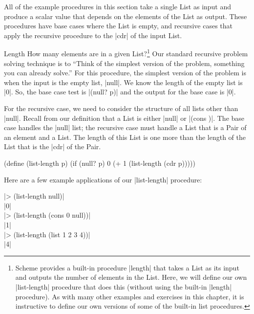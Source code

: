 \begin{schemeregion}
All of the example procedures in this section take a single List as input and produce a scalar value that depends on the elements of the List as output.  These procedures have base cases where the List is empty, and recursive cases that apply the recursive procedure to the \scheme|cdr| of the input List.

\begin{examplenobar}{Length}\label{example:length}  How many elements are in a given List?\footnote{Scheme provides a built-in procedure \scheme|length| that takes a List as its input and outputs the number of elements in the List.  Here, we will define our own \scheme|list-length| procedure that does this (without using the built-in \scheme|length| procedure).  As with many other examples and exercises in this chapter, it is instructive to define our own versions of some of the built-in list procedures.}  Our standard recursive problem solving technique is to ``Think of the simplest version of the problem, something you can already solve.''  For this procedure, the simplest version of the problem is when the input is the empty list, \scheme|null|.  We know the length of the empty list is \schemeresult|0|.  So, the base case test is \scheme|(null? p)| and the output for the base case is \scheme|0|.

For the recursive case, we need to consider the structure of all lists other than \scheme|null|.  Recall from our definition that a List is either \scheme|null| or \scheme|(cons \value \List)|.  The base case handles the \scheme|null| list; the recursive case must handle a List that is a Pair of an element and a List.  The length of this List is one more than the length of the List that is the \scheme|cdr| of the Pair.

\begin{schemedisplay}
(define (list-length p)
   (if (null? p) 
       0 
       (+ 1 (list-length (cdr p)))))
\end{schemedisplay}

Here are a few example applications of our \scheme|list-length| procedure:
\begin{code}
\scheme|> (list-length null)|\\
\schemeresult|0|\\
\scheme|> (list-length (cons 0 null))|\\
\schemeresult|1|\\
\scheme|> (list-length (list 1 2 3 4))|\\
\schemeresult|4|%
\end{code}
\end{examplenobar}


\end{schemeregion}
